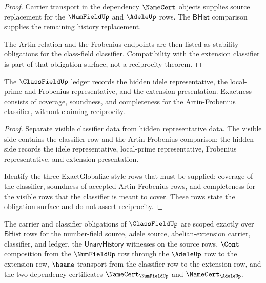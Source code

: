\begin{proof}
Carrier transport in the dependency $\NameCert$ objects supplies source replacement for the $\NumFieldUp$ and $\AdeleUp$ rows. The $\mathsf{BHist}$ comparison supplies the remaining history replacement.

The Artin relation and the Frobenius endpoints are then listed as stability obligations for the class-field classifier. Compatibility with the extension classifier is part of that obligation surface, not a reciprocity theorem.
\end{proof}

\begin{theorem}\label{thm:classfield-obligation-ledger-exactness}
The $\ClassFieldUp$ ledger records the hidden idele representative, the local-prime and Frobenius representative, and the extension presentation. Exactness consists of coverage, soundness, and completeness for the Artin-Frobenius classifier, without claiming reciprocity.
\end{theorem}

\begin{proof}
Separate visible classifier data from hidden representative data. The visible side contains the classifier row and the Artin-Frobenius comparison; the hidden side records the idele representative, local-prime representative, Frobenius representative, and extension presentation.

Identify the three ExactGlobalize-style rows that must be supplied: coverage of the classifier, soundness of accepted Artin-Frobenius rows, and completeness for the visible rows that the classifier is meant to cover. These rows state the obligation surface and do not assert reciprocity.
\end{proof}

\begin{theorem}\label{thm:classfield-scoped-carrier-classifier}
The carrier and classifier obligations of $\ClassFieldUp$ are scoped exactly over $\mathsf{BHist}$ rows for the number-field source, adele source, abelian-extension carrier, classifier, and ledger, the $\mathsf{UnaryHistory}$ witnesses on the source rows, $\Cont$ composition from the $\NumFieldUp$ row through the $\AdeleUp$ row to the extension row, $\hsame$ transport from the classifier row to the extension row, and the two dependency certificates $\NameCert_{\NumFieldUp}$ and $\NameCert_{\AdeleUp}$.
\end{theorem}

